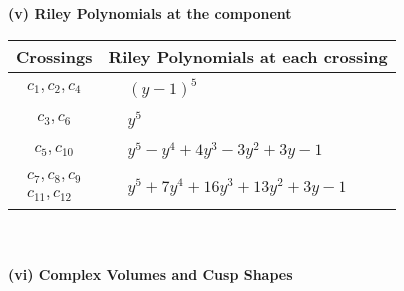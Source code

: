\documentclass[1p]{elsarticle_modified}
\theoremstyle{definition}
\begin{document}
\newpage\renewcommand{\arraystretch}{1}
\flushleft \textbf{(v) Riley Polynomials at the component}\newline \\
\begin{tabular}{m{50pt}|m{274pt}}
Crossings & \hspace{64pt}Riley Polynomials at each crossing \\
\hline $$\begin{aligned}c_{1},c_{2},c_{4}\end{aligned}$$&$\begin{aligned}
&(y-1)^5
\end{aligned}$\\
\hline $$\begin{aligned}c_{3},c_{6}\end{aligned}$$&$\begin{aligned}
&y^5
\end{aligned}$\\
\hline $$\begin{aligned}c_{5},c_{10}\end{aligned}$$&$\begin{aligned}
&y^5- y^4+4 y^3-3 y^2+3 y-1
\end{aligned}$\\
\hline $$\begin{aligned}c_{7},c_{8},c_{9}\\c_{11},c_{12}\end{aligned}$$&$\begin{aligned}
&y^5+7 y^4+16 y^3+13 y^2+3 y-1
\end{aligned}$\\
\hline
\end{tabular}\\~\\
\newpage\flushleft \textbf{(vi) Complex Volumes and Cusp Shapes}
\end{document}
